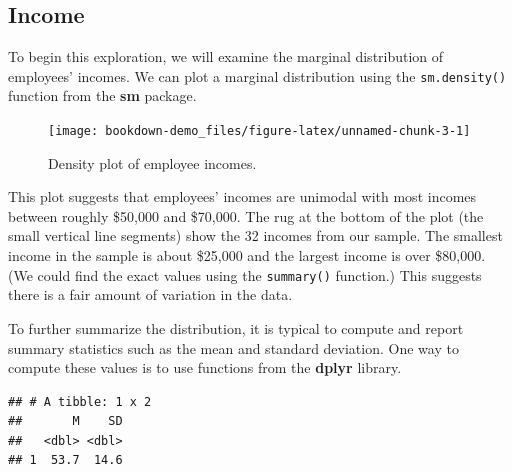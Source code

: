 \documentclass[]{book}
\newenvironment{Shaded}{\begin{snugshade}}{\end{snugshade}}
\newcommand{\DataTypeTok}[1]{\textcolor[rgb]{0.13,0.29,0.53}{#1}}
\newcommand{\KeywordTok}[1]{\textcolor[rgb]{0.13,0.29,0.53}{\textbf{#1}}}
\newcommand{\NormalTok}[1]{#1}
\newcommand{\OperatorTok}[1]{\textcolor[rgb]{0.81,0.36,0.00}{\textbf{#1}}}
\newcommand{\StringTok}[1]{\textcolor[rgb]{0.31,0.60,0.02}{#1}}
\theoremstyle{definition}
\theoremstyle{definition}
\theoremstyle{definition}
\theoremstyle{remark}
\begin{document}
\hypertarget{income}{%
\subsection{Income}\label{income}}

To begin this exploration, we will examine the marginal distribution of
employees' incomes. We can plot a marginal distribution using the
\texttt{sm.density()} function from the \textbf{sm} package.

\begin{Shaded}
\end{Shaded}

\begin{figure}
\texttt{[image: bookdown-demo\_files/figure-latex/unnamed-chunk-3-1]} \caption{Density plot of employee incomes.}\label{fig:unnamed-chunk-3}
\end{figure}

This plot suggests that employees' incomes are unimodal with most
incomes between roughly \$50,000 and \$70,000. The rug at the bottom of
the plot (the small vertical line segments) show the 32 incomes from our
sample. The smallest income in the sample is about \$25,000 and the
largest income is over \$80,000. (We could find the exact values using
the \texttt{summary()} function.) This suggests there is a fair amount
of variation in the data.

To further summarize the distribution, it is typical to compute and
report summary statistics such as the mean and standard deviation. One
way to compute these values is to use functions from the \textbf{dplyr}
library.

\begin{Shaded}
\end{Shaded}

\begin{verbatim}
## # A tibble: 1 x 2
##       M    SD
##   <dbl> <dbl>
## 1  53.7  14.6
\end{verbatim}
\end{document}
